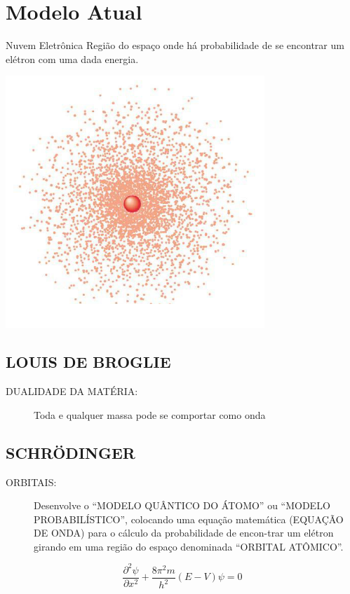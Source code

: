 \documentclass[10pt]{scrartcl}
\begin{document}
\section{Modelo Atual}
\label{sec:orge9ca809}
\begin{Box2}{Nuvem Eletrônica}
Região  do  espaço  onde  há  probabilidade  de  se  encontrar um elétron com uma dada energia.
\begin{center}
\includegraphics[scale=.4]{Quimica-Geral-Aula/nuvem.png}
\end{center}
\end{Box2}


\subsection{LOUIS DE BROGLIE}
\label{sec:org1c1c10b}

\begin{description}
\item[{DUALIDADE DA MATÉRIA:}] Toda e qualquer massa pode se comportar como onda
\end{description}


\subsection{SCHRÖDINGER}
\label{sec:orgcbcd153}

\begin{description}
\item[{ORBITAIS:}] Desenvolve o “MODELO QUÂNTICO DO ÁTOMO” ou “MODELO PROBABILÍSTICO”, colocando uma equação matemática (EQUAÇÃO DE ONDA) para o cálculo da probabilidade de encon-trar um elétron girando em uma região do espaço denominada “ORBITAL ATÔMICO”.
\end{description}
\begin{equation*}
\displaystyle\frac{\partial^2\psi}{\partial x^2} + \frac{8\pi^2m}{h^2}(E-V)\psi = 0
\end{equation*}
\end{document}
